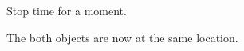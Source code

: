 \documentclass[]{standalone}
\begin{document}
\begin{minipage}{30ex}
    Stop time for a moment.

    The both objects are now at the same location.
\end{minipage}
\end{document}
